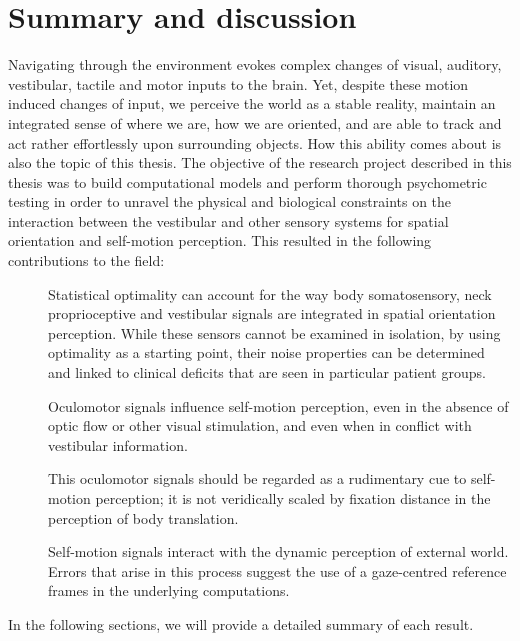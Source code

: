 
\chapter{Summary and discussion}
\chaptermark{}
\newpage

Navigating through the environment evokes complex changes of visual, auditory, vestibular, tactile and
motor inputs to the brain. Yet, despite these motion induced changes of input, we perceive the world as a stable reality, maintain an integrated sense of where we are, how we are oriented, and are able to track and act rather effortlessly upon surrounding objects. How this ability comes about is also the topic of this thesis. The objective of the research project described in this thesis was to build computational models and perform thorough psychometric testing in order to unravel the physical and biological constraints on the interaction between the vestibular and other sensory systems for spatial orientation and self-motion perception. This resulted in the following contributions to the field:

\begin{description}
\item[] Statistical optimality can account for the way body somatosensory, neck proprioceptive and vestibular signals are integrated in spatial orientation perception. While these sensors cannot be examined in isolation, by using optimality as a starting point, their noise properties can be determined and linked to clinical deficits that are seen in particular patient groups.
\item[] Oculomotor signals influence self-motion perception, even in the absence of optic flow or other visual stimulation, and even when in conflict with vestibular information. 
\item[] This oculomotor signals should be regarded as a rudimentary cue to self-motion perception; it is not veridically scaled by fixation distance in the perception of body translation. 
\item[] Self-motion signals interact with the dynamic perception of external world.  Errors that arise in this process suggest the use of a gaze-centred reference frames in the underlying computations. 
\end{description}

In the following sections, we will provide a detailed summary of each result. 

